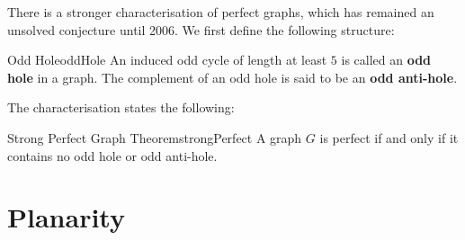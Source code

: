 \documentclass[math]{amznotes}
\makeatletter
\let\save@mathaccent\mathaccent
\newcommand*\if@single[3]{%
  \setbox0\hbox{${\mathaccent"0362{#1}}^H$}%
  \setbox2\hbox{${\mathaccent"0362{\kern0pt#1}}^H$}%
  \ifdim\ht0=\ht2 #3\else #2\fi
  }
\newcommand*\rel@kern[1]{\kern#1\dimexpr\macc@kerna}
\newcommand*\widebar[1]{\@ifnextchar^{{\wide@bar{#1}{0}}}{\wide@bar{#1}{1}}}
\newcommand*\wide@bar[2]{\if@single{#1}{\wide@bar@{#1}{#2}{1}}{\wide@bar@{#1}{#2}{2}}}
\newcommand*\wide@bar@[3]{%
  \begingroup
  \def\mathaccent##1##2{%
    \let\mathaccent\save@mathaccent
    \if#32 \let\macc@nucleus\first@char \fi
    \setbox\z@\hbox{$\macc@style{\macc@nucleus}_{}$}%
    \setbox\tw@\hbox{$\macc@style{\macc@nucleus}{}_{}$}%
    \dimen@\wd\tw@
    \advance\dimen@-\wd\z@
    \divide\dimen@ 3
    \@tempdima\wd\tw@
    \advance\@tempdima-\scriptspace
    \divide\@tempdima 10
    \advance\dimen@-\@tempdima
    \ifdim\dimen@>\z@ \dimen@0pt\fi
    \rel@kern{0.6}\kern-\dimen@
    \if#31
      \overline{\rel@kern{-0.6}\kern\dimen@\macc@nucleus\rel@kern{0.4}\kern\dimen@}%
      \advance\dimen@0.4\dimexpr\macc@kerna
      \let\final@kern#2%
      \ifdim\dimen@<\z@ \let\final@kern1\fi
      \if\final@kern1 \kern-\dimen@\fi
    \else
      \overline{\rel@kern{-0.6}\kern\dimen@#1}%
    \fi
  }%
  \macc@depth\@ne
  \let\math@bgroup\@empty \let\math@egroup\macc@set@skewchar
  \mathsurround\z@ \frozen@everymath{\mathgroup\macc@group\relax}%
  \macc@set@skewchar\relax
  \let\mathaccentV\macc@nested@a
  \if#31
    \macc@nested@a\relax111{#1}%
  \else
    \def\gobble@till@marker##1\endmarker{}%
    \futurelet\first@char\gobble@till@marker#1\endmarker
    \ifcat\noexpand\first@char A\else
      \def\first@char{}%
    \fi
    \macc@nested@a\relax111{\first@char}%
  \fi
  \endgroup
}
\theoremstyle{remark}
\makeatother
\begin{document}
There is a stronger characterisation of perfect graphs, which has remained an unsolved conjecture until 2006. We first define the following structure:
\begin{dfnbox}{Odd Hole}{oddHole}
    An induced odd cycle of length at least $5$ is called an {\color{red} \textbf{odd hole}} in a graph. The complement of an odd hole is said to be an {\color{red} \textbf{odd anti-hole}}.
\end{dfnbox}
The characterisation states the following:
\begin{thmbox}{Strong Perfect Graph Theorem}{strongPerfect}
    A graph $G$ is perfect if and only if it contains no odd hole or odd anti-hole.
\end{thmbox}
\chapter{Planarity}
\end{document}
